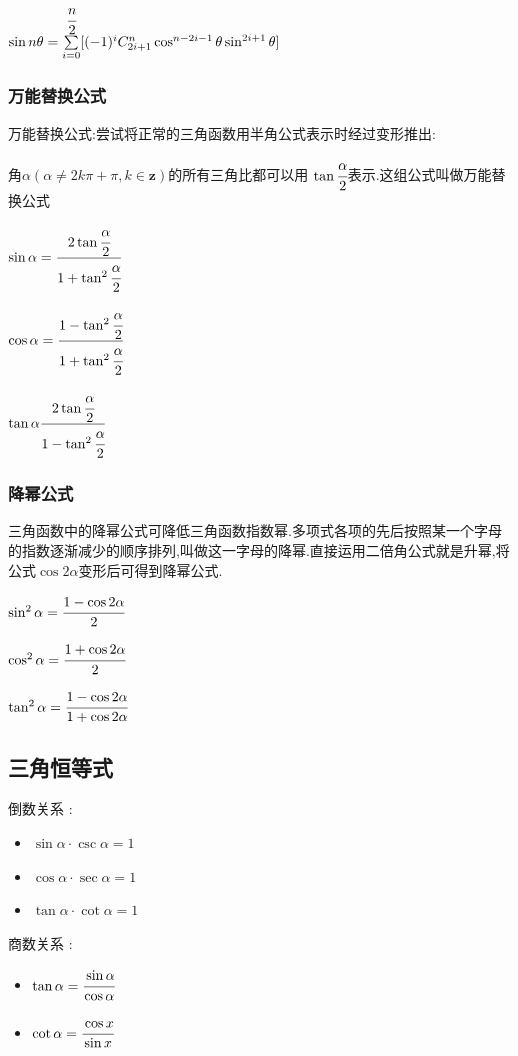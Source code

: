 \documentclass[UTF8,12pt]{ctexbook}
\newcommand{\mathCombination}[2]{C_{#1}^{#2}}
\newcommand{\upDownSum}[2]{\sum\limits_{#2}^{#1}}
\begin{document}
{{{{    $\sin{n\theta} = \upDownSum{\cfrac{n}{2}}{i = 0}[(-1)^i\mathCombination{2i + 1}{n}\cos^{n - 2i - 1}\theta\sin^{2i+1}\theta]$
  }%

  \subsubsection{万能替换公式}{
    万能替换公式:尝试将正常的三角函数用半角公式表示时经过变形推出:

    角$\alpha(\alpha \neq 2k\pi + \pi ,k \in \mathbf{z})$的所有三角比都可以用 $\tan\cfrac{\alpha}{2}$表示.这组公式叫做万能替换公式

    $\sin\alpha = \cfrac{2\tan\cfrac{\alpha}{2}}{1+\tan^2\cfrac{\alpha}{2}}$

    $\cos\alpha = \cfrac{1 - \tan^2\cfrac{\alpha}{2}}{1 + \tan^2\cfrac{\alpha}{2}}$

    $\tan\alpha \cfrac{2\tan\cfrac{\alpha}{2}}{1 - \tan^2\cfrac{\alpha}{2}}$
  }%

  \subsubsection{降幂公式}{
    三角函数中的降幂公式可降低三角函数指数幂.多项式各项的先后按照某一个字母的指数逐渐减少的顺序排列,叫做这一字母的降幂.直接运用二倍角公式就是升幂,将公式$\cos 2 \alpha$变形后可得到降幂公式.

    $\sin^2\alpha = \cfrac{1 - \cos2\alpha}{2}$

    $\cos^2\alpha = \cfrac{1 + \cos2\alpha}{2}$

    $\tan^2\alpha = \cfrac{1 - \cos2\alpha}{1 + \cos2\alpha}$
  }%

}%

\subsection{三角恒等式}{

  倒数关系 :
  \begin{itemize}
    \item $\sin\alpha \cdot \csc\alpha = 1$
    \item $\cos\alpha \cdot \sec\alpha = 1$
    \item $\tan\alpha \cdot \cot\alpha = 1$
  \end{itemize}

  商数关系 :
  \begin{itemize}
    \item $\tan\alpha = \cfrac{\sin\alpha}{\cos\alpha}$
    \item $\cot\alpha = \cfrac{\cos x}{\sin x}$
  \end{itemize}

}}}
\end{document}
